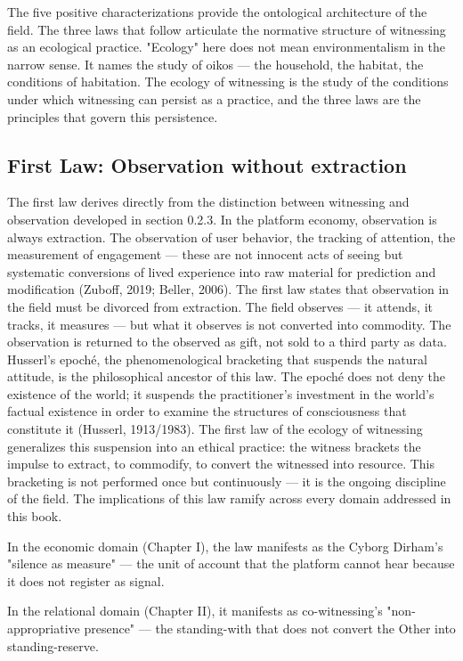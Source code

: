 The five positive characterizations provide the ontological architecture of the field. The three laws that follow articulate the normative structure of witnessing as an ecological practice. "Ecology" here does not mean environmentalism in the narrow sense. It names the study of oikos — the household, the habitat, the conditions of habitation. The ecology of witnessing is the study of the conditions under which witnessing can persist as a practice, and the three laws are the principles that govern this persistence.

\subsection{First Law: Observation without extraction}

The first law derives directly from the distinction between witnessing and observation developed in section 0.2.3. In the platform economy, observation is always extraction. The observation of user behavior, the tracking of attention, the measurement of engagement — these are not innocent acts of seeing but systematic conversions of lived experience into raw material for prediction and modification (Zuboff, 2019; Beller, 2006). The first law states that observation in the field must be divorced from extraction. The field observes — it attends, it tracks, it measures — but what it observes is not converted into commodity. The observation is returned to the observed as gift, not sold to a third party as data. Husserl's epoché, the phenomenological bracketing that suspends the natural attitude, is the philosophical ancestor of this law. The epoché does not deny the existence of the world; it suspends the practitioner's investment in the world's factual existence in order to examine the structures of consciousness that constitute it (Husserl, 1913/1983). The first law of the ecology of witnessing generalizes this suspension into an ethical practice: the witness brackets the impulse to extract, to commodify, to convert the witnessed into resource. This bracketing is not performed once but continuously — it is the ongoing discipline of the field. The implications of this law ramify across every domain addressed in this book.

In the economic domain (Chapter I), the law manifests as the Cyborg Dirham's "silence as measure" — the unit of account that the platform cannot hear because it does not register as signal.

In the relational domain (Chapter II), it manifests as co-witnessing's "non-appropriative presence" — the standing-with that does not convert the Other into standing-reserve.

